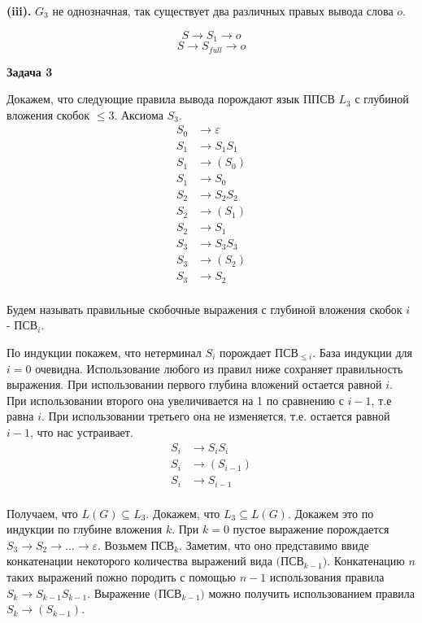 \documentclass[10pt]{article}
\let \eps \varepsilon
\begin{document}
{\bf (iii).} $G_3$ не однозначная, так существует два различных правых вывода слова $o$.

$$S \rightarrow S_1 \rightarrow o$$
$$S \rightarrow S_{full} \rightarrow o$$

\medskip

{\bf Задача 3}

Докажем, что следующие правила вывода порождают язык ППСВ $L_{3}$ с глубиной вложения скобок $\leq 3$. Аксиома $S_3$.
\begin{align*}
  S_0 &\rightarrow \eps \\
  S_1 &\rightarrow S_1 S_1 \\
  S_1 &\rightarrow ( S_0 ) \\
  S_1 &\rightarrow S_0 \\
  S_2 &\rightarrow S_2 S_2 \\
  S_2 &\rightarrow ( S_1 ) \\
  S_2 &\rightarrow S_1 \\
  S_3 &\rightarrow S_3 S_3 \\
  S_3 &\rightarrow ( S_2 ) \\
  S_3 &\rightarrow S_2 \\
\end{align*}

Будем называть правильные скобочные выражения с глубиной вложения скобок $i$ - ПСВ$_i$.

По индукции покажем, что нетерминал $S_i$ порождает ПСВ$_{\leq i}$. База индукции для $i = 0$ очевидна. Использование любого из правил ниже сохраняет правильность выражения. При использовании первого глубина вложений остается равной $i$. При использовании второго она увеличивается на 1 по сравнению с $i - 1$, т.е равна $i$. При использовании третьего она не изменяется, т.е. остается равной $i - 1$, что нас устраивает.
\begin{align*}
  S_i &\rightarrow S_i S_i \\
  S_i &\rightarrow ( S_{i - 1} ) \\
  S_i &\rightarrow S_{i - 1} \\
\end{align*}

Получаем, что $L(G) \subseteq L_3$. Докажем, что $L_3 \subseteq L(G)$. Докажем это по индукции по глубине вложения $k$. При $k = 0$ пустое выражение порождается $S_3 \rightarrow S_2 \rightarrow ... \rightarrow \eps$. Возьмем ПСВ$_k$. Заметим, что оно представимо ввиде конкатенации некоторого количества выражений вида $($ПСВ$_{k-1})$. Конкатенацию $n$ таких выражений пожно породить с помощью $n - 1$ использования правила $S_k \rightarrow S_{k - 1} S_{k - 1}$. Выражение $($ПСВ$_{k-1})$ можно получить использованием правила $S_k \rightarrow ( S_{k - 1} )$.
\end{document}
